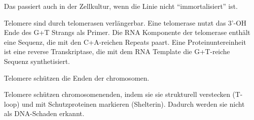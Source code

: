 Das passiert auch in der Zellkultur, wenn die Linie nicht ``immortalisiert'' ist.

Telomere sind durch \gls{telomerase}n verlängerbar.
Eine \gls{telomerase} nutzt das 3'-OH Ende
des G+T Strangs als Primer.
Die RNA Komponente der
\gls{telomerase} enthält eine Sequenz,
die mit den C+A-reichen Repeats
paart.
Eine Proteinuntereinheit ist eine
reverse Transkriptase, die mit dem
RNA Template die G+T-reiche
Sequenz synthetisiert. \cite{vorlesung3}

Telomere schützen die Enden der \gls{chromosom}en.

Telomere schützen \gls{chromosom}enenden, indem sie sie strukturell verstecken (T-loop) und mit Schutzproteinen
markieren (Shelterin).
Dadurch werden sie nicht als DNA-Schaden erkannt.

